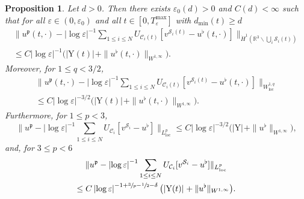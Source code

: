 \documentclass[10pt]{amsart}
\newcommand{\R}{\mathbb{R}}
\let\eps\varepsilon
\newcommand{\loc}{\mathrm{loc}}
\newcommand{\rY}{\mathrm{Y}}
\newtheorem{Proposition}[thm]{Proposition}
\theoremstyle{definition}
\theoremstyle{remark}
\let\oldbigcup\bigcup
\begin{document}
\begin{Proposition} \label{pro:u^p.U}
Let $d>0$. Then there exists $\eps_0(d) > 0$ and $C(d) < \infty$ such that for all $\eps \in (0,\eps_0)$ and all $t \in [0,T_\eps^{\max}]$
with $d_{\min}(t) \geq d$
\begin{multline} \label{est:fluid.velocities.-1}
\|u^\mathfrak{p}(t,\cdot) - \left|\log \eps\right|^{-1} \sum_{1 \leq i \leq N} U_{\mathcal C_i(t)}[v^{{\mathcal S}_i(t)} - u^\flat(t,\cdot)]\|_{\dot H^{1} (\R^3 \smallsetminus \oldbigcup_i {\mathcal S}_i(t)) }
\\
\leq C \left|\log \eps\right|^{-1} \big(|\rY(t)|_{} + \|u^\flat(t,\cdot)\|_{W^{1,\infty}} \big).
\end{multline}
Moreover, for $1 \leq q < 3/2$,
\begin{multline} \label{est:fluid.velocities.0}
\|u^\mathfrak{p}(t,\cdot) - \left|\log \eps\right|^{-1} \sum_{1 \leq i \leq N} U_{\mathcal C_i(t)}[v^{{\mathcal S}_i(t)} - u^\flat(t,\cdot)]\|_{W^{1,q}_{\loc}}
\\ \leq C \left|\log \eps\right|^{-3/2} \big(|\rY(t)|_{} + \|u^\flat(t,\cdot)\|_{W^{1,\infty}} \big).
\end{multline}
Furthermore, for $1 \leq p< 3$,
\begin{equation} \label{est:fluid.velocities.1}
\|u^\mathfrak{p} - \left|\log \eps\right|^{-1} \sum_{1 \leq i \leq N} U_{\mathcal C_i}[v^{{\mathcal S}_i} - u^\flat]\|_{L^p_{\loc}} \leq C \left|\log \eps\right|^{-3/2} \big(|\rY|_{} + \|u^\flat\|_{W^{1,\infty}} \big),
\end{equation}
and, for $3 \leq p < 6$
\begin{multline} \label{est:fluid.velocities.comment}
\|u^\mathfrak{p} - \left|\log \eps\right|^{-1} \sum_{1 \leq i \leq N} U_{\mathcal C_i}[v^{{\mathcal S}_i} - u^\flat]\|_{L^p_{\loc}}\\
\leq C \left|\log \eps\right|^{-1 + {\sfrac 3 p - \sfrac 1 2 - \delta}} \big(|\rY(t)|_{} + \|u^\flat\|_{W^{1,\infty}} \big).
\end{multline}
\end{Proposition}
\end{document}
